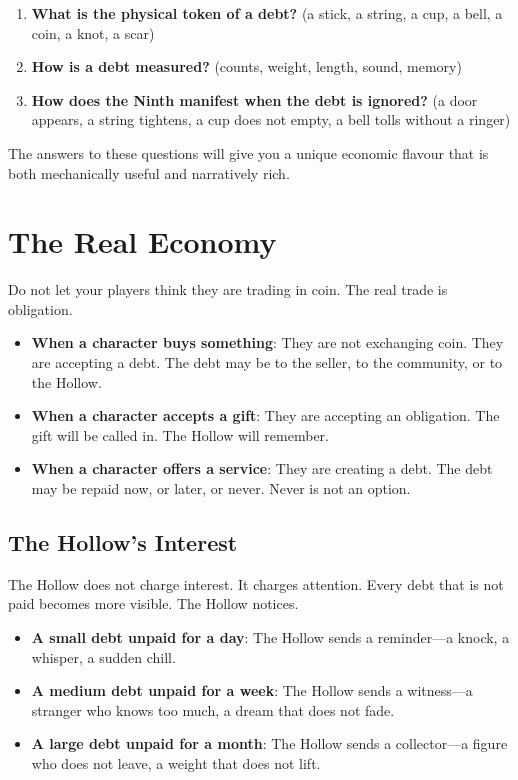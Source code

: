 \documentclass[12pt,oneside]{book}
\begin{document}
\begin{enumerate}
\item \textbf{What is the physical token of a debt?} (a stick, a string, a cup, a bell, a coin, a knot, a scar)
\item \textbf{How is a debt measured?} (counts, weight, length, sound, memory)
\item \textbf{How does the Ninth manifest when the debt is ignored?} (a door appears, a string tightens, a cup does not empty, a bell tolls without a ringer)
\end{enumerate}

The answers to these questions will give you a unique economic flavour that is both mechanically useful and narratively rich.

\section{The Real Economy}

Do not let your players think they are trading in coin. The real trade is obligation.

\begin{itemize}
\item \textbf{When a character buys something}: They are not exchanging coin. They are accepting a debt. The debt may be to the seller, to the community, or to the Hollow.
\item \textbf{When a character accepts a gift}: They are accepting an obligation. The gift will be called in. The Hollow will remember.
\item \textbf{When a character offers a service}: They are creating a debt. The debt may be repaid now, or later, or never. Never is not an option.
\end{itemize}

\subsection{The Hollow's Interest}

The Hollow does not charge interest. It charges attention. Every debt that is not paid becomes more visible. The Hollow notices.

\begin{itemize}
\item \textbf{A small debt unpaid for a day}: The Hollow sends a reminder---a knock, a whisper, a sudden chill.
\item \textbf{A medium debt unpaid for a week}: The Hollow sends a witness---a stranger who knows too much, a dream that does not fade.
\item \textbf{A large debt unpaid for a month}: The Hollow sends a collector---a figure who does not leave, a weight that does not lift.
\end{itemize}
\end{document}
